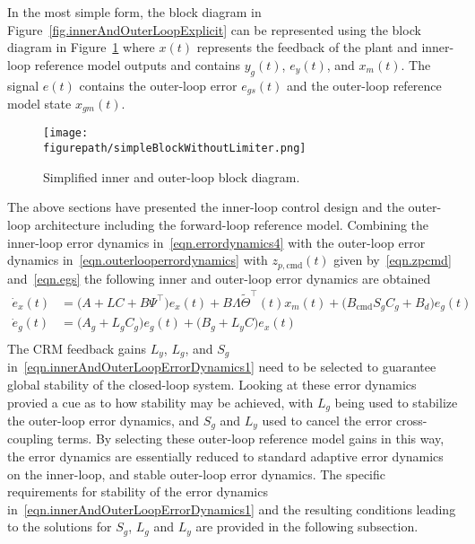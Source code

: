 In the most simple form, the block diagram in Figure~\ref{fig.innerAndOuterLoopExplicit} can be represented using the block diagram in Figure~\ref{fig.simpleBlockWithoutLimiter} where $x(t)$ represents the feedback of the plant and inner-loop reference model outputs and contains $y_{g}(t)$, $e_{y}(t)$, and $x_{m}(t)$.
The signal $e(t)$ contains the outer-loop error $e_{gs}(t)$ and the outer-loop reference model state $x_{gm}(t)$.

\begin{figure}[H]
  \begin{center}
    \texttt{[image: \\figurepath/simpleBlockWithoutLimiter.png]}
    \vspace{-0.1in}
    \caption{Simplified inner and outer-loop block diagram.\label{fig.simpleBlockWithoutLimiter}}
  \end{center}
\end{figure}

The above sections have presented the inner-loop control design and the outer-loop architecture including the forward-loop reference model.
Combining the inner-loop error dynamics in\ \eqref{eqn.errordynamics4} with the outer-loop error dynamics in\ \eqref{eqn.outerlooperrordynamics} with $z_{p,\text{cmd}}(t)$ given by\ \eqref{eqn.zpcmd} and\ \eqref{eqn.egs} the following inner and outer-loop error dynamics are obtained
\begin{equation}
  \label{eqn.innerAndOuterLoopErrorDynamics1}
  \begin{split}
    \dot{e}_{x}(t)
    &=
    \bigr(A+LC+B\Psi^{\top}\bigr)e_{x}(t) + B\Lambda\widetilde{\Theta}^{\top}(t)x_{m}(t) + \bigr(B_{\text{cmd}}S_{g}C_{g} + B_{d}\bigr)e_{g}(t) \\
    \dot{e}_{g}(t)
    &=
    \bigr(A_{g} + L_{g}C_{g}\bigr)e_{g}(t) + \bigr(B_{g} + L_{y}C\bigr)e_{x}(t) \\
  \end{split}
\end{equation}
The CRM feedback gains $L_{y}$, $L_{g}$, and $S_{g}$ in\ \eqref{eqn.innerAndOuterLoopErrorDynamics1} need to be selected to guarantee global stability of the closed-loop system.
Looking at these error dynamics provied a cue as to how stability may be achieved, with $L_{g}$ being used to stabilize the outer-loop error dynamics, and $S_{g}$ and $L_{y}$ used to cancel the error cross-coupling terms.
By selecting these outer-loop reference model gains in this way, the error dynamics are essentially reduced to standard adaptive error dynamics on the inner-loop, and stable outer-loop error dynamics.
The specific requirements for stability of the error dynamics in\ \eqref{eqn.innerAndOuterLoopErrorDynamics1} and the resulting conditions leading to the solutions for $S_{g}$, $L_{g}$ and $L_{y}$ are provided in the following subsection.

